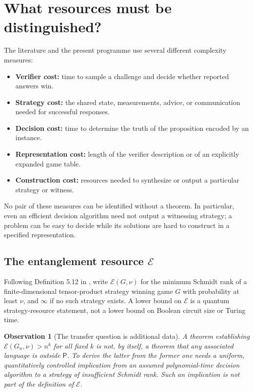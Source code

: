 \documentclass[11pt,a4paper]{article}
\newtheorem{observation}[proposition]{Observation}
\newcommand{\Pclass}{\mathsf{P}}
\newcommand{\E}{\mathcal{E}}
\begin{document}
\section{What resources must be distinguished?}
The literature and the present programme use several different complexity measures:
\begin{itemize}
\item \textbf{Verifier cost:} time to sample a challenge and decide whether reported answers win.
\item \textbf{Strategy cost:} the shared state, measurements, advice, or communication needed for successful responses.
\item \textbf{Decision cost:} time to determine the truth of the proposition encoded by an instance.
\item \textbf{Representation cost:} length of the verifier description or of an explicitly expanded game table.
\item \textbf{Construction cost:} resources needed to synthesize or output a particular strategy or witness.
\end{itemize}
No pair of these measures can be identified without a theorem. In particular, even an efficient decision algorithm need not output a witnessing strategy; a problem can be easy to decide while its solutions are hard to construct in a specified representation.

\subsection{The entanglement resource $\E$}
Following Definition 5.12 in \cite{jnvwy}, write $\E(G,\nu)$ for the minimum Schmidt rank of a finite-dimensional tensor-product strategy winning game $G$ with probability at least $\nu$, and $\infty$ if no such strategy exists. A lower bound on $\E$ is a quantum strategy-resource statement, not a lower bound on Boolean circuit size or Turing time.

\begin{observation}[The transfer question is additional data]
A theorem establishing $\E(G_n,\nu)>n^k$ for all fixed $k$ is not, by itself, a theorem that any associated language is outside $\Pclass$. To derive the latter from the former one needs a uniform, quantitatively controlled implication from an assumed polynomial-time decision algorithm to a strategy of insufficient Schmidt rank. Such an implication is not part of the definition of $\E$.
\end{observation}
\end{document}

